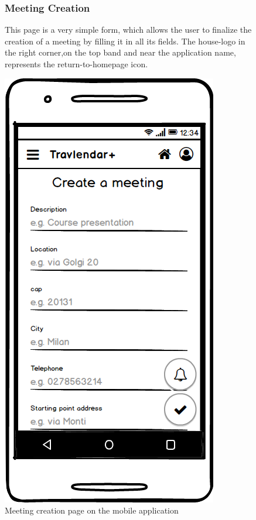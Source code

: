 	\begin{figure}
			\begin{flushleft}
			\subsubsection{Meeting Creation}
			This page is a very simple form, which allows the user to finalize the creation of a meeting by filling it in all its fields. 
			The house-logo in the  right corner,on the top band and near the application name, represents the return-to-homepage icon. 
		\end{flushleft}
		\centering
		\includegraphics[width=0.6\linewidth]{mockups/CreateMeeting}
		\caption{Meeting creation page on the mobile application}
		\label{fig:createmeeting}
	\end{figure}
	
